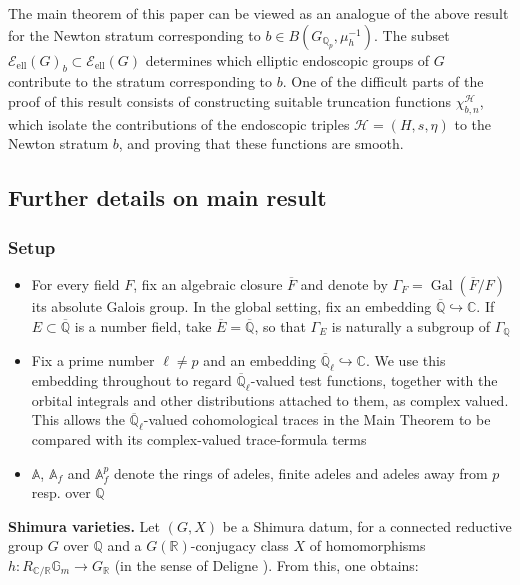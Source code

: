 \documentclass[11pt,a4paper]{article}
\newcommand{\Eell}{\mathcal{E}_{\mathrm{ell}}}
\theoremstyle{definition}
\theoremstyle{plain}
\theoremstyle{remark}
\theoremstyle{plain}
\begin{document}
The main theorem of this paper can be viewed as an analogue of the above result for the Newton stratum corresponding to $b \in B(G_{\mathbb{Q}_p}, \mu_h^{-1})$. The subset $\Eell(G)_b \subset \Eell(G)$ determines which elliptic endoscopic groups of $G$ contribute to the stratum corresponding to $b$. One of the difficult parts of the proof of this result consists of constructing suitable truncation functions $\chi_{b,n}^{\mathcal{H}}$, which isolate the contributions of the endoscopic triples $\mathcal{H} = (H, s , \eta)$ to the Newton stratum $b$, and proving that these functions are smooth.

\subsection{Further details on main result}\label{details}
\subsubsection{Setup}\label{detailssetup}
	    \begin{itemize}
	    \item For every field $F$, fix an algebraic closure $\overline{F}$ and denote by $\Gamma_F=\operatorname{Gal}(\overline{F}/F)$ its absolute Galois group. In the global setting, fix an embedding $\overline{\mathbb{Q}}\hookrightarrow\mathbb{C}$. If $E\subset\overline{\mathbb{Q}}$ is a number field, take $\overline{E}=\overline{\mathbb{Q}}$, so that $\Gamma_E$ is naturally a subgroup of $\Gamma_{\mathbb{Q}}$
	    \item Fix a prime number $\ell \neq p$ and an embedding $\overline{\mathbb{Q}}_\ell\hookrightarrow\mathbb{C}$. We use this embedding throughout to regard $\overline{\mathbb{Q}}_\ell$-valued test functions, together with the orbital integrals and other distributions attached to them, as complex valued. This allows the $\overline{\mathbb{Q}}_\ell$-valued cohomological traces in the Main Theorem to be compared with its complex-valued trace-formula terms
	    \item $\mathbb{A}$, $\mathbb{A}_f$ and $\mathbb{A}_f^p$ denote the rings of adeles, finite adeles and adeles away from $p$ resp. over $\mathbb{Q}$
	\end{itemize}

\textbf{Shimura varieties.}
Let $(G,X)$ be a Shimura datum, for a connected reductive group $G$ over $\mathbb{Q}$ and a $G(\mathbb{R})$-conjugacy class $X$ of homomorphisms $h: R_{\mathbb{C}/\mathbb{R}} \mathbb{G}_m \xrightarrow{} G_{\mathbb{R}}$ (in the sense of Deligne \cite{MR546620}). From this, one obtains:
\end{document}
